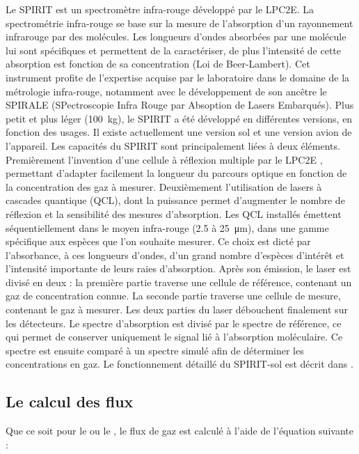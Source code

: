 Le SPIRIT est un spectromètre infra-rouge développé par le LPC2E.
La spectrométrie infra-rouge se base sur la mesure de l'absorption d'un rayonnement infrarouge par des molécules.
Les longueurs d'ondes absorbées par une molécule lui sont spécifiques et permettent de la caractériser, de plus l'intensité de cette absorption est fonction de sa concentration  (Loi de Beer-Lambert).
Cet instrument profite de l'expertise acquise par le laboratoire dans le domaine de la métrologie infra-rouge, notamment avec le développement de son ancêtre le SPIRALE (SPectroscopie Infra Rouge par Absoption de Lasers Embarqués).
Plus petit et plus léger (\SI{100}{\kilo\gram}), le SPIRIT a été développé en différentes versions, en fonction des usages.
Il existe actuellement une version sol et une version avion de l'appareil.
Les capacités du SPIRIT sont principalement liées à deux éléments.
Premièrement l'invention d'une cellule à réflexion multiple par le LPC2E \citep{robert2007}, permettant d'adapter facilement la longueur du parcours optique en fonction de la concentration des gaz à mesurer.
Deuxièmement l'utilisation de lasers à cascades quantique (QCL), dont la puissance permet d'augmenter le nombre de réflexion et la sensibilité des mesures d'absorption.
Les QCL installés émettent séquentiellement dans le moyen infra-rouge (\num{2.5} à \SI{25}{\micro\metre}), dans une gamme spécifique aux espèces que l'on souhaite mesurer.
Ce choix est dicté par l'absorbance, à ces longueurs d'ondes, d'un grand nombre d'espèces d'intérêt et l'intensité importante de leurs raies d'absorption.
Après son émission, le laser est divisé en deux : 
la première partie traverse une cellule de référence, contenant un gaz de concentration connue.
La seconde partie traverse une cellule de mesure, contenant le gaz à mesurer.
Les deux parties du laser débouchent finalement sur les détecteurs.
Le spectre d'absorption est divisé par le spectre de référence, ce qui permet de conserver uniquement le signal lié à l'absorption moléculaire. Ce spectre est ensuite comparé à un spectre simulé afin de déterminer les concentrations en gaz.
Le fonctionnement détaillé du SPIRIT-sol est décrit dans \cite{guimbaud2011}.

\subsection{Le calcul des flux}

Que ce soit pour le \coo ou le \chh, le flux de gaz est calculé à l'aide de l'équation suivante : 

